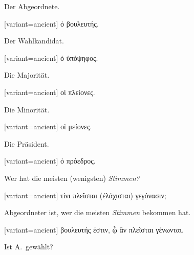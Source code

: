Der Abgeordnete.

\switchcolumn

\begin{greek}[variant=ancient]%
ὁ βουλευτής.

\end{greek}%
\switchcolumn*

Der Wahlkandidat.

\switchcolumn

\begin{greek}[variant=ancient]%
ὁ ὑπόψηφος.

\end{greek}%
\switchcolumn*

Die Majorität.

\switchcolumn

\begin{greek}[variant=ancient]%
οἱ πλείονες.

\end{greek}%
\switchcolumn*

Die Minorität.

\switchcolumn

\begin{greek}[variant=ancient]%
οἱ μείονες.

\end{greek}%
\switchcolumn*

Die Präsident.

\switchcolumn

\begin{greek}[variant=ancient]%
ὁ πρόεδρος.

\end{greek}%
\switchcolumn*

Wer hat die meisten (wenigsten) \emph{Stimmen?}

\switchcolumn

\begin{greek}[variant=ancient]%
τίνι πλεῖσται (ἐλάχισται) γεγόνασιν;

\end{greek}%
\switchcolumn*

Abgeordneter ist, wer die meisten \emph{Stimmen} bekommen hat. 

\switchcolumn

\begin{greek}[variant=ancient]%
βουλευτής ἐστιν, ᾧ ἂν πλεῖσται γένωνται.

\end{greek}%
\switchcolumn*

Ist A.\ gewählt?

